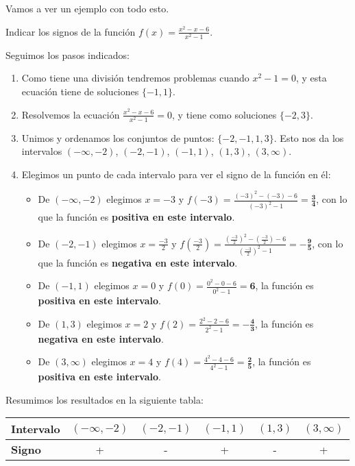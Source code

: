 \documentclass[a4paper,11pt,answers]{exam}
\newcommand\ddfrac[2]{\frac{\displaystyle #1}{\displaystyle #2}}
\begin{document}
Vamos a ver un ejemplo con todo esto.
\begin{questions}
\question Indicar los signos de la función $f(x) = \frac{x^2 - x -6}{x^2 - 1}$.
\begin{solution}
Seguimos los pasos indicados:
\begin{enumerate}
	\item Como tiene una división tendremos problemas cuando $x^2 -1 = 0$, y esta ecuación tiene de soluciones $\{-1, 1\}$.
	\item Resolvemos la ecuación $\frac{x^2 - x -6}{x^2 - 1} = 0$, y tiene como soluciones $\{-2, 3\}$.
	\item Unimos y ordenamos los conjuntos de puntos: $\{-2, -1, 1, 3\}$. Esto nos da los intervalos $(-\infty, -2)$, $(-2, -1)$, $(-1, 1)$, $(1, 3)$, $(3, \infty)$.
	\item Elegimos un punto de cada intervalo para ver el signo de la función en él:
	\begin{itemize}
		\item De $(-\infty, -2)$ elegimos $x=-3$ y $f(-3) = \frac{(-3)^2 - (-3) - 6}{(-3) ^2 - 1} = \boldsymbol{\frac{3}{4}}$, con lo que la función es \textbf{positiva en este intervalo}.
		\item De $(-2, -1)$ elegimos $x = \frac{-3}{2}$ y $f\left(\frac{-3}{2}\right) =  \ddfrac{\left(\frac{-3}{2}\right)^2- \left(\frac{-3}{2}\right) - 6}{\left(\frac{-3}{2}\right)^2 - 1} = \boldsymbol{-\frac{9}{5}}$, con lo que la función es \textbf{negativa en este intervalo}.
		\item De $(-1, 1)$ elegimos $x= 0$ y $f(0) = \frac{0^2 - 0 - 6}{0^2- 1} = \boldsymbol{6}$, la función es \textbf{positiva en este intervalo}.
		\item De $(1, 3)$ elegimos $x = 2$ y $f(2) = \frac{2^2 - 2 - 6}{2^2 - 1} = \boldsymbol{-\frac{4}{3}}$, la función es \textbf{negativa en este intervalo}.
		\item De $(3, \infty)$ elegimos $x=4$ y $f(4) =\frac{4^2 - 4 - 6}{4^2 - 1} = \boldsymbol{\frac{2}{5}}$, la función es \textbf{positiva en este intervalo}. 
	\end{itemize}
\end{enumerate}
Resumimos los resultados en la siguiente tabla:
\begin{center}
\begin{tabular}{|l|c|c|c|c|c|}
\hline
\textbf{Intervalo} & $(-\infty, -2)$ & $(-2, -1)$ & $(-1, 1)$ & $(1, 3)$ & $(3, \infty)$ \\ \hline
\textbf{Signo}     & +               & -          & +         & -        & +             \\ \hline
\end{tabular}
\end{center}


\end{solution}
\end{questions}
\end{document}
